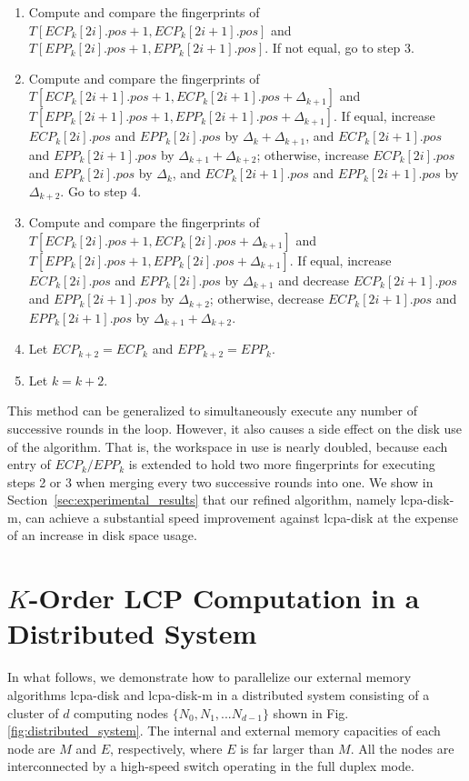 \documentclass[10pt,journal,letterpaper,compsoc]{IEEEtran}
\begin{document}
\begin{CJK*}{GBK}{song}
\begin{enumerate}
\item Compute and compare the fingerprints of $T[ECP_k[2i].pos+1,ECP_k[2i+1].pos]$ and $T[EPP_k[2i].pos+1,EPP_k[2i+1].pos]$. If not equal, go to step 3.
\item Compute and compare the fingerprints of $T[ECP_k[2i+1].pos+1,ECP_k[2i+1].pos+\Delta_{k+1}]$ and $T[EPP_k[2i+1].pos+1,EPP_k[2i+1].pos+\Delta_{k+1}]$. If equal, increase $ECP_k[2i].pos$ and $EPP_k[2i].pos$ by $\Delta_{k}+\Delta_{k+1}$, and $ECP_k[2i+1].pos$ and $EPP_k[2i+1].pos$ by $\Delta_{k+1}+\Delta_{k+2}$; otherwise, increase $ECP_k[2i].pos$ and $EPP_k[2i].pos$ by $\Delta_{k}$, and $ECP_k[2i+1].pos$ and $EPP_k[2i+1].pos$ by $\Delta_{k+2}$. Go to step 4.
\item Compute and compare the fingerprints of $T[ECP_k[2i].pos+1,ECP_k[2i].pos+\Delta_{k+1}]$ and $T[EPP_k[2i].pos+1,EPP_k[2i].pos+\Delta_{k+1}]$. If equal, increase $ECP_k[2i].pos$ and $EPP_k[2i].pos$ by $\Delta_{k+1}$ and decrease $ECP_k[2i+1].pos$ and $EPP_k[2i+1].pos$ by $\Delta_{k+2}$; otherwise, decrease $ECP_k[2i+1].pos$ and $EPP_k[2i+1].pos$ by $\Delta_{k+1}+\Delta_{k+2}$.
\item Let $ECP_{k+2}=ECP_{k}$ and $EPP_{k+2}=EPP_{k}$.
\item Let $k = k+2$.
\end{enumerate}

This method can be generalized to simultaneously execute any number of successive rounds in the loop. However, it also causes a side effect on the disk use of the algorithm. That is, the workspace in use is nearly doubled, because each entry of $ECP_k/EPP_k$ is extended to hold two more fingerprints for executing steps 2 or 3 when merging every two successive rounds into one. We show in Section~\ref{sec:experimental_results} that our refined algorithm, namely lcpa-disk-m, can achieve a substantial speed improvement against lcpa-disk at the expense of an increase in disk space usage.

\section{$K$-Order LCP Computation in a Distributed System}\label{sec:construction_in_distributed}
In what follows, we demonstrate how to parallelize our external memory algorithms lcpa-disk and lcpa-disk-m in a distributed system consisting of a cluster of $d$ computing nodes $\{N_0, N_1, ...N_{d-1}\}$ shown in Fig.\ref{fig:distributed_system}. The internal and external memory capacities of each node are $M$ and $E$, respectively, where $E$ is far larger than $M$. All the nodes are interconnected by a high-speed switch operating in the full duplex mode.

\end{CJK*}
\end{document}
